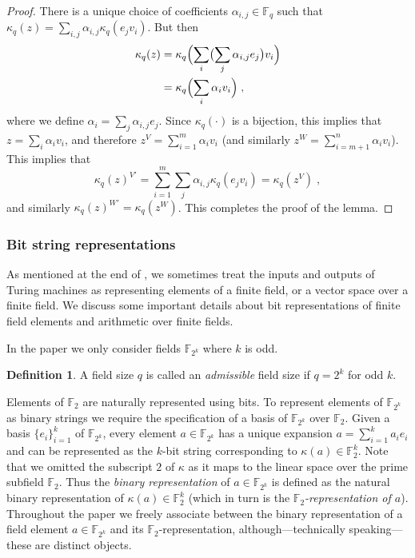 \documentclass[11pt]{article}
\theoremstyle{definition}
\newtheorem{definition}[theorem]{Definition}
\newcommand{\F}{\ensuremath{\mathbb{F}}}
\newcommand{\downsize}{\kappa}
\begin{document}
\begin{proof}
  There is a unique choice of coefficients $\alpha_{i, j} \in \F_q$ such that
  $\downsize_q(z) = \sum_{i, j} \alpha_{i, j} \downsize_q(e_j v_i)$.
  But then
  \begin{align*}
    \downsize_q(z) & = \downsize_q \Bigl( \sum_i \bigl ( \sum_j
                     \alpha_{i, j} e_j \bigr) v_i \Bigr) \\
                   & = \downsize_q \Bigl( \sum_i \alpha_i v_i \Bigr)\;,
  \end{align*}
  where we define $\alpha_i = \sum_j \alpha_{i, j} e_j$.
  Since $\downsize_q(\cdot)$ is a bijection, this implies that $z = \sum_i
  \alpha_i v_i$, and therefore $z^V = \sum_{i=1}^m \alpha_i v_i$ (and similarly
  $z^W = \sum_{i=m+1}^n \alpha_i v_i$).
  This implies that
  \begin{equation*}
	  \downsize_q(z)^{V'} = \sum_{i=1}^m \sum_{j} \alpha_{i, j}
    \downsize_q(e_j v_i) = \downsize_q (z^V)\;,
  \end{equation*}
  and similarly $\downsize_q(z)^{W'} = \downsize_q(z^W)$.
  This completes the proof of the lemma.
\end{proof}

\subsubsection{Bit string representations}
\label{sec:ff-representations}

As mentioned at the end of , we sometimes treat the
inputs and outputs of Turing machines as representing elements of a finite
field, or a vector space over a finite field.
We discuss some important details about bit representations of finite field
elements and arithmetic over finite fields.

In the paper we only consider fields $\F_{2^k}$ where $k$ is odd. 

\begin{definition}\label{def:admissible-size}
  A field size $q$ is called an \emph{admissible} field size if $q=2^k$ for odd
  $k$.
\end{definition}

Elements of $\F_2$ are naturally represented using bits. 
To represent elements of $\F_{2^k}$ as binary strings we require the
specification of a basis of $\F_{2^k}$ over $\F_2$.
Given a basis $\{e_i\}_{i=1}^k$ of $\F_{2^k}$, every element $a \in \F_{2^k}$
has a unique expansion $a = \sum_{i=1}^k a_i e_i$ and can be represented as the
$k$-bit string corresponding to $\downsize(a) \in \F_2^k$.
Note that we omitted the subscript $2$ of $\downsize$ as it maps to the linear
space over the prime subfield $\F_2$.
Thus the \emph{binary representation} of $a \in \F_{2^k}$ is defined as the
natural binary representation of $\downsize(a) \in \F_2^k$ (which in turn is the
\emph{$\F_2$-representation of $a$}).
Throughout the paper we freely associate between the binary representation of a
field element $a \in \F_{2^k}$ and its $\F_2$-representation,
although---technically speaking---these are distinct objects.
\end{document}
